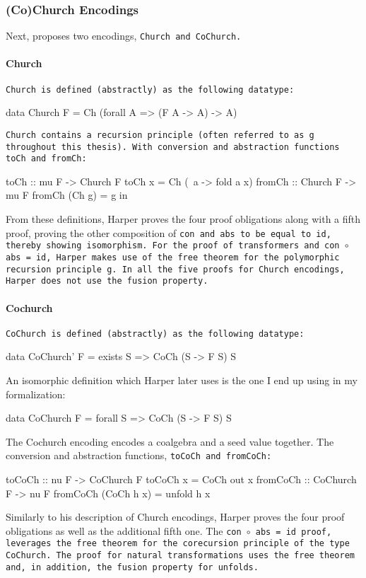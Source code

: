 \subsubsection{(Co)Church Encodings}
Next, \cite{Harper2011} proposes two encodings, \tt{Church} and \tt{CoChurch}.

\paragraph{Church} \tt{Church} is defined (abstractly) as the following datatype:
\begin{code}
data Church F = Ch (forall A => (F A -> A) -> A)
\end{code}
\tt{Church} contains a recursion principle (often referred to as \tt{g} throughout this thesis).
With conversion and abstraction functions \tt{toCh} and \tt{fromCh}:
\begin{code}
toCh :: mu F -> Church F
toCh x = Ch (\ a -> fold a x)
fromCh :: Church F -> mu F
fromCh (Ch g) = g in
\end{code}
From these definitions, Harper proves the four proof obligations along with a fifth proof, proving the other composition of \tt{con} and \tt{abs} to be equal to \tt{id}, thereby showing isomorphism.
For the proof of transformers and \tt{con $\circ$ abs = id}, Harper makes use of the free theorem for the polymorphic recursion principle \tt{g}.
In all the five proofs for Church encodings, Harper does not use the fusion property.

\paragraph{Cochurch} \tt{CoChurch} is defined (abstractly) as the following datatype:
\begin{code}
data CoChurch' F = exists S => CoCh (S -> F S) S
\end{code}
An isomorphic definition which Harper later uses is the one I end up using in my formalization:
\begin{code}
data CoChurch F = forall S => CoCh (S -> F S) S
\end{code}
The Cochurch encoding encodes a coalgebra and a seed value together.
The conversion and abstraction functions, \tt{toCoCh} and \tt{fromCoCh}:
\begin{code}
toCoCh :: nu F -> CoChurch F
toCoCh x = CoCh out x
fromCoCh :: CoChurch F -> nu F
fromCoCh (CoCh h x) = unfold h x  
\end{code}
Similarly to his description of Church encodings, Harper proves the four proof obligations as well as the additional fifth one.
The \tt{con $\circ$ abs = id} proof, leverages the free theorem for the corecursion principle of the type \tt{CoChurch}.
The proof for natural transformations uses the free theorem and, in addition, the fusion property for unfolds.

